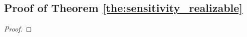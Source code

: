 \documentclass[twoside,11pt]{article}
\begin{document}
\subsection{Proof of Theorem \ref{the:sensitivity_realizable}}
\label{sec:proof_the_sensitivity_realizable}

\begin{proof} %

\end{proof}
\end{document}
